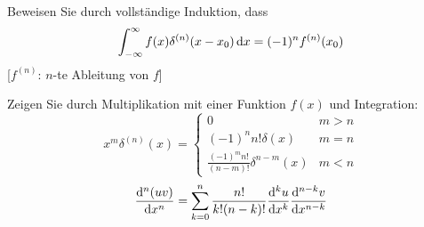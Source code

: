 \documentclass{atistandalonetask}
\begin{document}
  \begin{atiTask}[
    title = Die Ableitung der Delta-Distribution
  ]
    \begin{atiSubtasks}
    	\item Beweisen Sie durch vollständige Induktion, dass
    	\[
    	\int_{-\infty}^{\infty} f(x)\delta^{(n)}(x-x_0)\,\mathrm{d} x=(-1)^nf^{(n)}(x_0)
    	\]
    	[$f^{(n)}$: $n$-te Ableitung von $f$]
    	\item Zeigen Sie durch Multiplikation mit einer Funktion $f(x)$ und Integration:
    	\[
    	x^m\delta^{(n)}(x)=\begin{cases}
    	0 & m>n\\
    	(-1)^n n!\delta(x)& m=n\\
    	\frac{(-1)^m n!}{(n-m)!}\delta^{n-m}(x) & m<n
    	\end{cases}
    	\]
		\[
		\leibnizDerivative[n]{(uv)}{x}=\sum _{k=0}^n \frac{n!}{k! (n-k)!}\leibnizDerivative[k]{u}{x}\leibnizDerivative[n-k]{v}{x}
		\]
    \end{atiSubtasks}	
  \end{atiTask}
  \begin{atiSolution}
  	
    
  \end{atiSolution}
\end{document}
